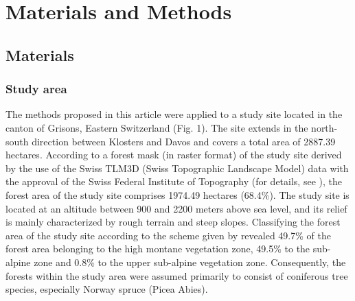 
\section{Materials and Methods}
\label{sec:Meth}



\subsection{Materials}
\label{sec:mat}

\subsubsection{Study area}
\label{sec:studarea}

The methods proposed in this article were applied to a study site located in the canton of Grisons, Eastern Switzerland (Fig. 1). The site extends in the north-south direction between Klosters and Davos and covers a total area of 2887.39 hectares. According to a forest mask (in raster format) of the study site derived by the use of the Swiss TLM3D (Swiss Topographic Landscape Model) data with the approval of the Swiss Federal Institute of Topography (for details, see \citet{hill2013}), the forest area of the study site comprises 1974.49 hectares (68.4\%). The study site is located at an altitude between 900 and 2200 meters above sea level, and its relief is mainly characterized by rough terrain and steep slopes. Classifying the forest area of the study site according to the scheme given by \citep{ott1997} revealed 49.7\% of the forest area belonging to the high montane vegetation  zone, 49.5\% to the sub-alpine zone and 0.8\% to the upper sub-alpine vegetation zone. Consequently, the forests within the study area were assumed primarily to consist of coniferous tree species, especially Norway spruce (Picea Abies).

